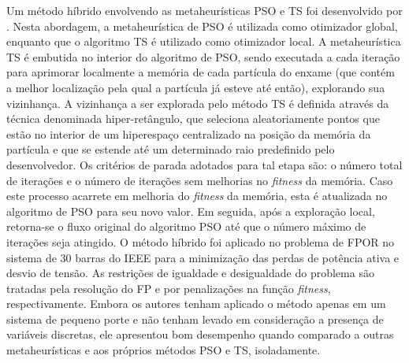 \documentclass[
	12pt,				%
	openany,			%
	twoside,			%
	a4paper,			%
	chapter=TITLE,		%
	section=Title,		%
	subsection=Title,	%
	subsubsection=Title,%
	english,			%
	french,				%
	spanish,			%
	brazil			%
	]{abntex2}
\begin{document}
\begin{ERRATA}
Um método híbrido envolvendo as metaheurísticas PSO e TS foi desenvolvido por . Nesta abordagem, a metaheurística de PSO é utilizada como otimizador global, enquanto que o algoritmo TS é utilizado como otimizador local. A metaheurística TS é embutida no interior do algoritmo de PSO, sendo executada a cada iteração para aprimorar localmente a memória de cada partícula do enxame (que contém a melhor localização pela qual a partícula já esteve até então), explorando sua vizinhança. A vizinhança a ser explorada pelo método TS é definida através da técnica denominada hiper-retângulo, que seleciona aleatoriamente pontos que estão no interior de um hiperespaço centralizado na posição da memória da partícula e que se estende até um determinado raio predefinido pelo desenvolvedor. Os critérios de parada adotados para tal etapa são: o número total de iterações e o número de iterações sem melhorias no \emph{fitness} da memória. Caso este processo acarrete em melhoria do \emph{fitness} da memória, esta é atualizada no algoritmo de PSO para seu novo valor. Em seguida, após a exploração local, retorna-se o fluxo original do algoritmo PSO até que o número máximo de iterações seja atingido. O método híbrido foi aplicado no problema de FPOR no sistema de 30 barras do IEEE para a minimização das perdas de potência ativa e desvio de tensão. As restrições de igualdade e desigualdade do problema são tratadas pela resolução do FP e por penalizações na função \emph{fitness}, respectivamente. Embora os autores tenham aplicado o método apenas em um sistema de pequeno porte e não tenham levado em consideração a presença de variáveis discretas, ele apresentou bom desempenho quando comparado a outras metaheurísticas e aos próprios métodos PSO e TS, isoladamente. 
 

\end{ERRATA}
\end{document}

